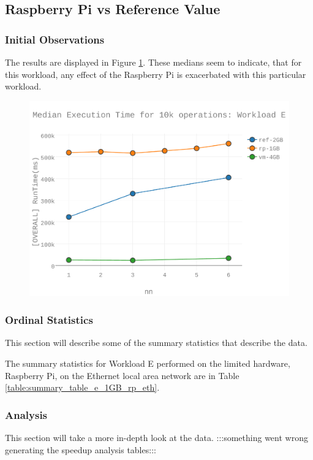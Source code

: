 \subsection{Raspberry Pi vs Reference Value}
\subsubsection{Initial Observations}
The results are displayed in Figure \ref{figures-wle_fig6}.  These medians seem to indicate, that for this workload, any effect of the Raspberry Pi is exacerbated with this particular workload. \begin{figure}[h]
\includegraphics[width=5.5in]{Figures/figures-wle_fig6.pdf}
\caption{}
\label{figures-wle_fig6}
\end{figure}



\subsubsection{Ordinal Statistics}
This section will describe some of the summary statistics that describe the data.  

The summary statistics for Workload E performed on the limited hardware, Raspberry Pi, on the Ethernet local area network are in Table \ref{table:summary_table_e_1GB_rp_eth}.



\subsubsection{Analysis}
This section will take a more in-depth look at the data.
:::something went wrong generating the speedup analysis tables:::

